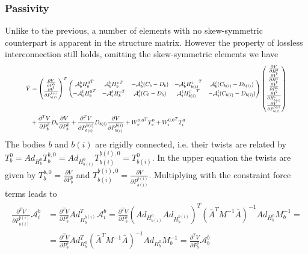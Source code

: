 \documentclass[a4paper,twoside, openright,12pt]{report}
\begin{document}
\subsubsection{Passivity}
Unlike to the previous, a number of elements with no skew-symmetric counterpart is apparent in the structure matrix. However the property of lossless interconnection still holds, omitting the skew-symmetric elements we have
\begin{eqnarray}
\resizebox{0.9\hsize}{!}{$
\begin{aligned}
\dot{V} &= 
\begin{pmatrix}\frac{\partial V}{\partial P_b^b} \\ 
\frac{\partial V}{\partial P_{b(i)}^{b(i)}}
\end{pmatrix}^T
\begin{pmatrix}
\mathcal{A}_b^b {H_b^0}^T & \mathcal{A}_b^b {H_b^v}^T & -\mathcal{A}_b^b(C_b-D_b) & -\mathcal{A}_b^i {H_{b(i)}^i}^T & \mathcal{A}_b^i (C_{b(i)} - D_{b(i)}) \\
-\mathcal{A}_i^b {H_b^0}^T & -\mathcal{A}_i^b {H_b^v}^T & \mathcal{A}_i^b(C_b-D_b)  & \mathcal{A}_i^i {H_{b(i)}^i}^T & -\mathcal{A}_i^i (C_{b(i)} - D_{b(i)})
\end{pmatrix}
\begin{pmatrix}\frac{\partial V}{\partial H_b^0}\\ \frac{\partial V}{\partial H_b^v} \\ \frac{\partial V}{\partial P_b^b} \\ \frac{\partial V}{\partial H_{b(i)}^i} \\ 
\frac{\partial V}{\partial P_{b(i)}^{b(i)}}\end{pmatrix}\\
&+ \frac{\partial^T V}{\partial P_b^b} D_b \frac{\partial V}{\partial P_b^b} + \frac{\partial^T V}{\partial P_{b(i)}^{b(i)}} D_{b(i)} \frac{\partial V}{\partial P_{b(i)}^{b(i)}} + {W_v^{0,0}}^T T_v^0 + {W_i^{0,0}}^T T_i^0
\end{aligned}
$}
\end{eqnarray}   
The bodies $b$ and $b(i)$ are rigidly connected, i.e. their twists are related by $T_b^0 = Ad_{H_b^0} T_b^{b,0} = Ad_{H_{b(i)}^0} T_{b(i)}^{b(i),0} = T_{b(i)}^0$. In the upper equation the twists are given by $T_{b}^{b,0} = \frac{\partial V}{\partial P_{b}^{b}}$ and $T_{b(i)}^{b(i),0} = \frac{\partial V}{\partial P_{b(i)}^{b(i)}}$. Multiplying with the constraint force terms leads to
\begin{eqnarray}
\begin{aligned}
\frac{\partial^T V}{\partial P_{b(i)}^{b(i)}} \mathcal{A}_i^b &= \frac{\partial^T V}{\partial P_b^b}Ad_{H_b^{b(i)}}^T\mathcal{A}_i^b = \frac{\partial^T V}{\partial P_b^b} (Ad_{H_{b(i)}^0}Ad_{H_b^{b(i)}})^T (\bar{A}^TM^{-1}\bar{A})^{-1} Ad_{H_b^0}M_b^{-1} = \\ 
&= \frac{\partial^T V}{\partial P_b^b} Ad_{H_b^0}^T (\bar{A}^TM^{-1}\bar{A})^{-1} Ad_{H_b^0}M_b^{-1} = \frac{\partial^T V}{\partial P_b^b} \mathcal{A}_b^b
\end{aligned}
\end{eqnarray}
\end{document}
